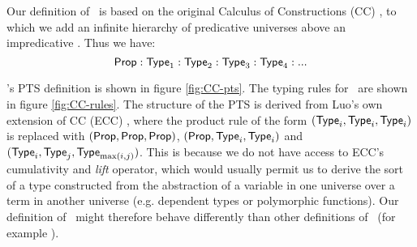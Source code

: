 \documentclass[10pt]{article}
\begin{document}
Our definition of \CC\ is based on the original Calculus of Constructions (CC) \cite{CC}, to which we add an infinite hierarchy of predicative universes above an impredicative \Prop. Thus we have: $$\textsf{Prop} : \textsf{Type}_1 : \textsf{Type}_2 : \textsf{Type}_3 : \textsf{Type}_4 : ...$$

\CC's PTS definition is shown in figure \ref{fig:CC-pts}. The typing rules for \CC\ are shown in figure \ref{fig:CC-rules}. The structure of the PTS is derived from Luo's own extension of CC (ECC) \cite{luo}, where the product rule of the form $(\textsf{Type}_i, \textsf{Type}_i, \textsf{Type}_i)$ is replaced with $(\textsf{Prop}, \textsf{Prop}, \textsf{Prop})$, $(\textsf{Prop},\textsf{Type}_i,\textsf{Type}_i)$ and $(\textsf{Type}_i, \textsf{Type}_j, \textsf{Type}_{\max (i,j)})$. This is because we do not have access to ECC's cumulativity and \emph{lift} operator, which would usually permit us to derive the sort of a type constructed from the abstraction of a variable in one universe over a term in another universe (e.g. dependent types or polymorphic functions). Our definition of \CC\ might therefore behave differently than other definitions of \CC\ (for example \cite{miquel}).
\end{document}
